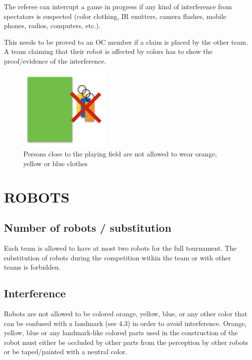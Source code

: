\documentclass{article}
\begin{document}
The referee can interrupt a game in progress if any kind of interference from
spectators is suspected (color clothing, IR emitters, camera flashes, mobile
phones, radios, computers, etc.).

This needs to be proved to an OC member if a claim is placed by the other team.
A team claiming that their robot is affected by colors has to show the
proof/evidence of the interference.

\begin{figure}[H]
    \centering
    \includegraphics[width=0.4\textwidth]{media/image2.png}
    \caption{Persons close to the playing field are not allowed to wear orange,
        yellow or blue clothes}
    \label{fig:spectators}
\end{figure}


\section{ROBOTS\label{ref-018}}

\subsection{ Number of robots / substitution \label{ref-number-of-robots}}

Each team is allowed to have at most two robots for the full tournament. The
substitution of robots during the competition within the team or with other
teams is forbidden.

\subsection{ Interference \label{ref-interference}}

Robots are not allowed to be colored orange, yellow, blue, or any other color
that can be confused with a landmark (see 4.3) in order to avoid interference.
Orange, yellow, blue or any landmark-like colored parts used in the
construction of the robot must either be occluded by other parts from the
perception by other robots or be taped/painted with a neutral color.
\end{document}
